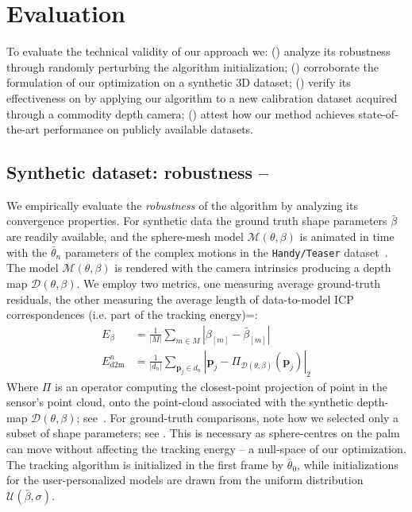 \section{Evaluation}
To evaluate the technical validity of our approach we:
() analyze its robustness through randomly perturbing the algorithm initialization; 
() corroborate the formulation of our optimization on a synthetic 3D dataset;
() verify its effectiveness on by applying our algorithm to a new calibration dataset acquired through a commodity depth camera; 
() attest how our method achieves state-of-the-art performance on publicly available datasets.

\subsection{Synthetic dataset: robustness -- }
\label{sec:evalsynth}
We empirically evaluate the \emph{robustness} of the algorithm by analyzing its convergence properties. 
For synthetic data the ground truth shape parameters $\bar\beta$ are readily available, and the sphere-mesh model $\mathcal{M}(\theta,\beta)$ is animated in time with the $\bar\theta_n$ parameters of the complex motions in the \texttt{Handy/Teaser} dataset~\cite{tkach2016sphere}.
The model $\mathcal{M}(\theta,\beta)$ is rendered with the camera intrinsics producing a depth map $\mathcal{D}(\theta,\beta)$. We employ two metrics, one measuring average ground-truth residuals, the other measuring the average length of data-to-model ICP correspondences (i.e. part of the tracking energy)=:
% 
\begin{align}
E_{\beta} &= \tfrac{1}{|M|} \sum_{m \in M} \left| \beta_{[m]} - \bar\beta_{[m]} \right|
\\
E_\text{d2m}^n &= \tfrac{1}{|d_n|} \sum_{\mathbf{p}_j \in d_n} \left| \mathbf{p}_j - \Pi_{\mathcal{D}(\theta,\beta)}(\mathbf{p}_j) \right|_2
\label{eq:metrics}
\end{align}
% 
Where $\Pi$ is an operator computing the closest-point projection of point in the sensor's point cloud, onto the point-cloud associated with the synthetic depth-map $\mathcal{D}(\theta,\beta)$; see~\cite{tkach2016sphere}. For ground-truth comparisons, note how we selected only a subset  of shape parameters; see . This is necessary as sphere-centres on the palm can move without affecting the tracking energy -- a null-space of our optimization.
% 
The tracking algorithm is initialized in the first frame by $\bar\theta_0$, while initializations for the user-personalized models are drawn from the uniform distribution {\small $\mathcal{U}(\bar\beta, \sigma)$}.
